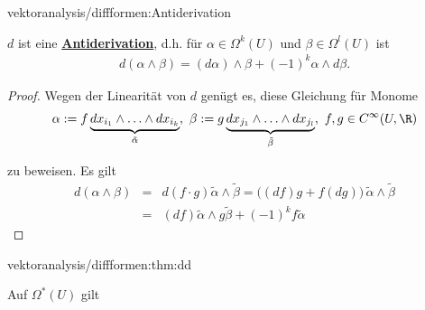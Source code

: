 \documentclass[letterpaper,10pt,english]{jupyterBook}
\begin{document}
\begin{theorem}{}{vektoranalysis/diffformen:Antiderivation}



\par
\(d\) ist eine \href{https://de.wikipedia.org/wiki/Derivation\_(Mathematik)\#Antiderivationen}{\textbf{Antiderivation}}, d.h. für \(\alpha\in\Omega^k(U)\) und \(\beta\in\Omega^l(U)\) ist
\begin{align*}
d(\alpha\wedge\beta) = (d\alpha)\wedge\beta+(-1)^k\alpha\wedge d\beta.
\end{align*}\end{theorem}

\begin{proof}
 Wegen der Linearität von \(d\) genügt es, diese Gleichung für Monome
\begin{align*}
\alpha := f\underbrace{dx_{i_1}\wedge\ldots\wedge dx_{i_k}}_{\tilde
{\alpha}},\ \beta := g\underbrace{dx_{j_1}\wedge\ldots\wedge dx_{j_l}}_
{\tilde{\beta}},\ f,g\in C^\infty(U,\R)
\end{align*}
\par
zu beweisen.
Es gilt
\begin{align*}
d(\alpha\wedge\beta) &=& d(f\cdot g)\tilde{\alpha}\wedge
\tilde{\beta} = \big((df)g+f(dg)\big)\,\tilde{\alpha}\wedge\tilde{\beta}\\
&=& (df)\tilde{\alpha}\wedge g\tilde{\beta}+ (-1)^kf\tilde{\alpha}
\end{align*}\end{proof}
\begin{theorem}{}{vektoranalysis/diffformen:thm:dd}



\par
Auf \(\Omega^*(U)\) gilt
\end{theorem}
\end{document}
